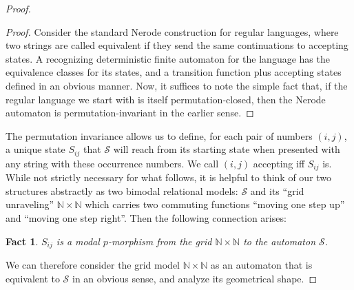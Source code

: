 \documentclass[12pt,oneside,reqno]{amsart}
\newtheorem{fact}{Fact}
\theoremstyle{definition}
\begin{document}
\begin{proof}
\begin{proof}  Consider the standard Nerode construction for regular languages, where two strings are called equivalent if they send the same continuations to accepting states. A recognizing deterministic finite automaton for the language has the equivalence classes for its states, and a transition function plus  accepting states defined in an obvious manner. Now, it suffices to note the simple fact that, if the regular language we start with is itself permutation-closed, then the Nerode automaton is permutation-invariant in the earlier sense. \end{proof}





   


The permutation invariance allows us to define, for each pair of numbers $(i, j)$, a unique state $S_{ij}$ that $\mathcal{S}$ will reach from its starting state when presented with any string with these occurrence numbers. We call $(i, j)$ accepting iff $S_{ij}$ is. While not strictly necessary for what follows, it is helpful to think of our two structures abstractly as two  bimodal relational models: $\mathcal{S}$ and its ``grid unraveling'' $\mathbb{N} \times \mathbb{N}$ which carries two commuting functions ``moving one step up'' and ``moving one step right''. Then the following connection arises:


\begin{fact}	$S_{ij}$ is a modal $p$-morphism from the grid $\mathbb{N} \times \mathbb{N}$ to the automaton $\mathcal{S}$.\end{fact}

We can therefore consider the grid model $\mathbb{N} \times \mathbb{N}$ as an automaton that is equivalent to $\mathcal{S}$ in an obvious sense, and analyze its geometrical shape.  


\end{proof}
\end{document}
